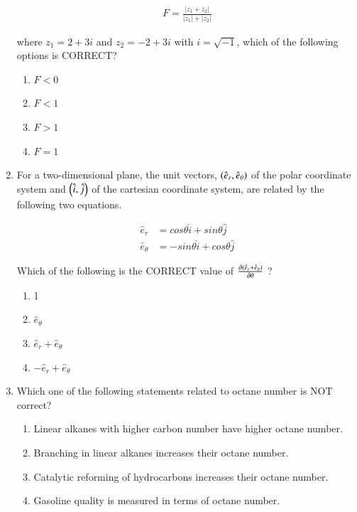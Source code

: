 \documentclass[journal,12pt,onecolumn]{IEEEtran}
\theoremstyle{remark}
\begin{document}
\begin{enumerate}
    \begin{align*}
      F = \frac{|z_1 + z_2|}{|z_1| + |z_2|}
    \end{align*}

    where $z_1 = 2 + 3i$ and $z_2 = -2 + 3i$ with $i = \sqrt{-1}$, which of the following options is CORRECT?
    
\hfill{}
\begin{enumerate}
    \item $F < 0$
    \item $F < 1$
    \item $F > 1$
    \item $F = 1$
\end{enumerate}

    \item For a two-dimensional plane, the unit vectors, $\left(\hat{e}_{r}, \hat{e}_{\theta}\right)$ of the polar coordinate system and $\left(\hat{i}, \hat{j}\right)$ of the cartesian coordinate system, are related by the following two equations.

    \begin{align*}
        \hat{e}_{r} &= cos\theta \hat{i} + sin\theta \hat{j} \\
        \hat{e}_{\theta} &= -sin\theta \hat{i} + cos\theta \hat{j}
    \end{align*}

    Which of the following is the CORRECT value of $\frac{\partial \left(\hat{e}_{r} + \hat{e}_{\theta}\right)}{\partial \theta}$ ?
    
\hfill{}
\begin{enumerate}
    \item 1
    \item $\hat{e}_{\theta}$
    \item $\hat{e}_{r} + \hat{e}_{\theta}$
    \item $-\hat{e}_{r} + \hat{e}_{\theta}$
\end{enumerate}

    \item Which one of the following statements related to octane number is NOT correct?
    
\hfill{}
\begin{enumerate}
    \item Linear alkanes with higher carbon number have higher octane number.
    \item Branching in linear alkanes increases their octane number.
    \item Catalytic reforming of hydrocarbons increases their octane number.
    \item Gasoline quality is measured in terms of octane number.
\end{enumerate}


\end{enumerate}
\end{document}
